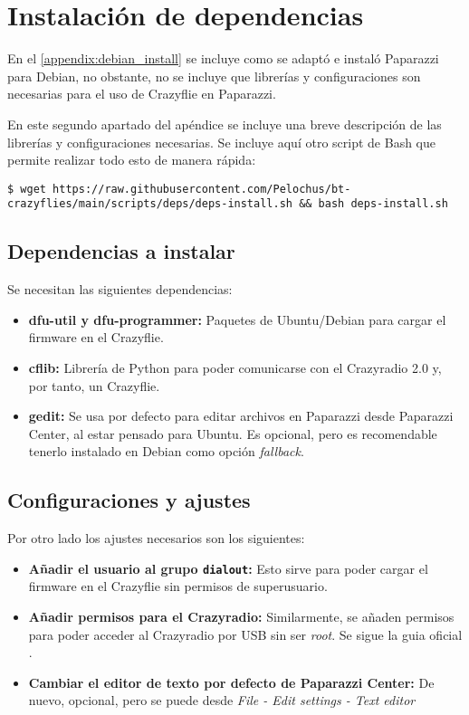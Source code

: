 \chapter{Instalación de dependencias}\label{appendix:crazyflie_dependencies}

En el \autoref{appendix:debian_install} se incluye como se adaptó e instaló Paparazzi para Debian, no obstante,
no se incluye que librerías y configuraciones son necesarias para el uso de Crazyflie en Paparazzi.

En este segundo apartado del apéndice se incluye una breve descripción de las librerías y configuraciones necesarias. 
Se incluye aquí otro script de Bash que permite realizar todo esto de manera rápida:

\begin{lstlisting}[style=CodigoBash]
$ wget https://raw.githubusercontent.com/Pelochus/bt-crazyflies/main/scripts/deps/deps-install.sh && bash deps-install.sh
\end{lstlisting}

\section{Dependencias a instalar}
Se necesitan las siguientes dependencias:

\begin{itemize}
    \item \textbf{dfu-util y dfu-programmer:} 
    Paquetes de Ubuntu/Debian para cargar el firmware en el Crazyflie.

    \item \textbf{cflib:}
    Librería de Python para poder comunicarse con el Crazyradio 2.0 y, por tanto, un Crazyflie.

    \item \textbf{gedit:}
    Se usa por defecto para editar archivos en Paparazzi desde Paparazzi Center, al estar pensado para Ubuntu. 
    Es opcional, pero es recomendable tenerlo instalado en Debian como opción \textit{fallback}.
\end{itemize}

\section{Configuraciones y ajustes}
Por otro lado los ajustes necesarios son los siguientes:

\begin{itemize}
    \item \textbf{Añadir el usuario al grupo \texttt{dialout}:} 
    Esto sirve para poder cargar el firmware en el Crazyflie sin permisos de superusuario. 

    \item \textbf{Añadir permisos para el Crazyradio:}
    Similarmente, se añaden permisos para poder acceder al Crazyradio por USB sin ser \textit{root}. 
    Se sigue la guia oficial \cite{usb_permissions_crazyradio}.

    \item \textbf{Cambiar el editor de texto por defecto de Paparazzi Center:}
    De nuevo, opcional, pero se puede desde \textit{File - Edit settings - Text editor}
\end{itemize}

